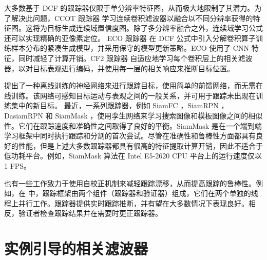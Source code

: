 大多数基于 DCF 的跟踪器仅限于单分辨率特征图，从而极大地限制了其潜力。为了解决此问题，CCOT 跟踪器 \cite{CCOT} 学习连续卷积滤波器以融合以不同分辨率获得的特征图。这将为目标生成连续域置信度图。除了多分辨率融合之外，连续域学习公式还可以实现精确的亚像素定位。
ECO 跟踪器 \cite{Danelljan2017ECOEC} 在 DCF 公式中引入分解卷积算子训练样本分布的紧凑生成模型，并采用保守的模型更新策略。ECO 使用了 CNN 特征，同时减轻了计算开销。CF2 跟踪器 \cite{Ma2015HierarchicalCF} 自适应地学习每个卷积层上的相关滤波器，以对目标表观进行编码，并使用每一层的相关响应来推断目标位置。

\cite{GOTURN} 提出了一种离线训练的神经网络来进行跟踪目标，使用简单的前馈网络，而无需在线训练。该网络可感知目标运动与表观之间的一般关系，并可用于跟踪未出现在训练集中的新目标。
最近，一系列跟踪器，例如 SiamFC \cite{SiamFC}，SiamRPN \cite{SiamRPN}，DasiamRPN \cite{zhu2018distractor} 和 SiamMask \cite{Wang2018SiamMask}，使用孪生网络来学习搜索图像和模板图像之间的相似性。它们在跟踪速度和准确性之间取得了良好的平衡。SiamMask 是在一个端到端学习框架中同时执行跟踪和分割的首次尝试。尽管在准确性和鲁棒性方面都具有良好的性能，但是上述大多数跟踪器都具有很高的特征提取计算开销，因此不适合于低功耗平台。例如，SiamMask 算法在 Intel E5-2620 CPU 平台上的运行速度仅以 1 FPS。

也有一些工作致力于使用自校正机制来减轻跟踪漂移，从而提高跟踪的鲁棒性。例如，在 \cite{fan2018parallel} 中，跟踪框架由两个组件（跟踪器和验证器）组成，它们在两个单独的线程上并行工作。跟踪器提供实时跟踪推断，并有望在大多数情况下表现良好。相反，验证者检查跟踪结果并在需要时更正跟踪器。

\section{实例引导的相关滤波器}

